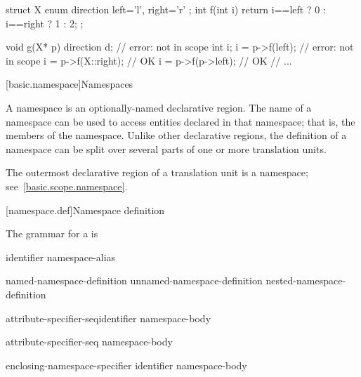 \begin{codeblock}
struct X {
  enum direction { left='l', right='r' };
  int f(int i) { return i==left ? 0 : i==right ? 1 : 2; }
};

void g(X* p) {
  direction d;                  // error:  not in scope
  int i;
  i = p->f(left);               // error:  not in scope
  i = p->f(X::right);           // OK
  i = p->f(p->left);            // OK
  // ...
}
\end{codeblock}
\exitexample

[basic.namespace]{Namespaces}%

\pnum
A namespace is an optionally-named declarative region. The name of a
namespace can be used to access entities declared in that namespace;
that is, the members of the namespace. Unlike other declarative regions,
the definition of a namespace can be split over several parts of one or
more translation units.

\pnum
The outermost declarative region of a translation unit is a namespace;
see~\ref{basic.scope.namespace}.

[namespace.def]{Namespace definition}%
%

\pnum
The grammar for a
is

\begin{bnf}
\br
        identifier\br
        namespace-alias
\end{bnf}

\begin{bnf}
\br
        named-namespace-definition\br
        unnamed-namespace-definition\br
        nested-namespace-definition
\end{bnf}

\begin{bnf}
\br
          attribute-specifier-seq\opt identifier \terminal{\{} namespace-body \terminal{\}}
\end{bnf}

\begin{bnf}
\br
          attribute-specifier-seq\opt \terminal{\{} namespace-body \terminal{\}}
\end{bnf}

\begin{bnf}
\br
         enclosing-namespace-specifier \terminal{::} identifier \terminal{\{} namespace-body \terminal{\}}
\end{bnf}

